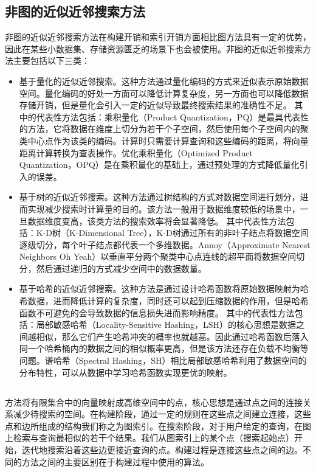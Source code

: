 \subsection{非图的近似近邻搜索方法}
非图的近似近邻搜索方法在构建开销和索引开销方面相比图方法具有一定的优势，因此在某些小数据集、存储资源匮乏的场景下也会被使用。非图的近似近邻搜索方法主要包括以下三类：
\begin{itemize}
  \item 基于量化的近似近邻搜索。这种方法通过量化编码的方式来近似表示原始数据空间。量化编码的好处一方面可以降低计算复杂度，另一方面也可以降低数据存储开销，但是量化会引入一定的近似导致最终搜索结果的准确性不足。
  其中的代表性方法包括：乘积量化\cite{pq-2010}（Product Quantization，PQ）是最具代表性的方法，它将数据在维度上切分为若干个子空间，然后使用每个子空间内的聚类中心点作为该类的编码。计算时只需要计算查询和这些编码的距离，将向量距离计算转换为查表操作。优化乘积量化\cite{opq-2013}（Optimized Product Quantization，OPQ）是在乘积量化的基础上，通过预处理的方式降低量化引入的误差。

  \item 基于树的近似近邻搜索。这种方法通过树结构的方式对数据空间进行划分，进而实现减少搜索时计算量的目的。该方法一般用于数据维度较低的场景中，一旦数据维度变高，该类方法的搜索效率将会显著降低\cite{AQA-1998}。
  其中代表性方法包括：K-D树\cite{kdtree-2008}（K-Dimensional Tree），K-D树通过所有的非叶子结点将数据空间逐级切分，每个叶子结点都代表一个多维数据。Annoy\cite{Annoy}（Approximate Nearest Neighbors Oh Yeah）以垂直平分两个聚类中心点连线的超平面将数据空间切分，然后通过递归的方式减少空间中的数据数量。

  \item 基于哈希的近似近邻搜索。这种方法是通过设计哈希函数将原始数据映射为哈希数据，进而降低计算的复杂度，同时还可以起到压缩数据的作用，但是哈希函数不可避免的会导致数据的信息损失进而影响精度。
  其中的代表性方法包括：局部敏感哈希\cite{lsh-1999,lsh-2004}（Locality-Sensitive Hashing，LSH）的核心思想是数据之间越相似，那么它们产生哈希冲突的概率也就越高。因此通过哈希函数后落入同一个哈希桶内的数据之间的相似概率更高，但是该方法还存在负载不均衡等问题。谱哈希\cite{sh-2008}（Spectral Hashing，SH）相比局部敏感哈希利用了数据空间的分布特性，可以从数据中学习哈希函数实现更优的映射。
\end{itemize}


\subsection{\ganns}
\ganns 方法将有限集合中的向量映射成高维空间中的点，核心思想是通过点之间的连接关系减少待搜索的空间。在构建阶段，通过一定的规则在这些点之间建立连接，这些点和边所组成的结构我们称之为图索引。在搜索阶段，对于用户给定的查询，在图上检索与查询最相似的若干个结果。我们从图索引上的某个点（搜索起始点）开始，迭代地搜索沿着这些边更接近查询的点。构建过程是连接这些点之间的边。不同的\ganns 方法之间的主要区别在于构建过程中使用的算法。

